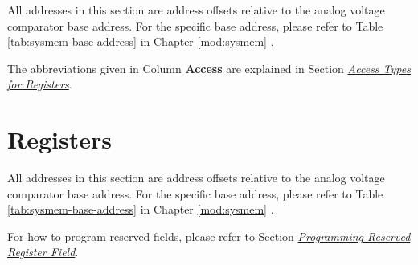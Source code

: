 \documentclass[main\_\_EN.tex]{subfiles}
\begin{document}
All addresses in this section are address offsets relative to the analog voltage comparator base address. For the specific base address, please refer to Table \ref{tab:sysmem-base-address} in Chapter \ref{mod:sysmem} \textit{}.

The abbreviations given in Column \textbf{Access} are explained in Section \hyperref[glossary-access-types]{\textit{Access Types for Registers}}.









\newpage
\section{Registers}

All addresses in this section are address offsets relative to the analog voltage comparator base address. For the specific base address, please refer to Table \ref{tab:sysmem-base-address} in Chapter \ref{mod:sysmem} \textit{}.

For how to program reserved fields, please refer to Section \hyperref[programming-reserved-field]{\textit{Programming Reserved Register Field}}.




\end{document}
